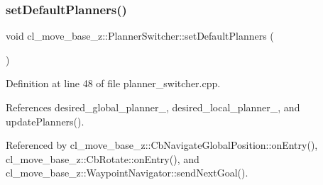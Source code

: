 \subsubsection{\texorpdfstring{set\+Default\+Planners()}{setDefaultPlanners()}}
{\footnotesize\ttfamily void cl\+\_\+move\+\_\+base\+\_\+z\+::\+Planner\+Switcher\+::set\+Default\+Planners (\begin{DoxyParamCaption}{ }\end{DoxyParamCaption})}



Definition at line 48 of file planner\+\_\+switcher.\+cpp.



References desired\+\_\+global\+\_\+planner\+\_\+, desired\+\_\+local\+\_\+planner\+\_\+, and update\+Planners().



Referenced by cl\+\_\+move\+\_\+base\+\_\+z\+::\+Cb\+Navigate\+Global\+Position\+::on\+Entry(), cl\+\_\+move\+\_\+base\+\_\+z\+::\+Cb\+Rotate\+::on\+Entry(), and cl\+\_\+move\+\_\+base\+\_\+z\+::\+Waypoint\+Navigator\+::send\+Next\+Goal().


